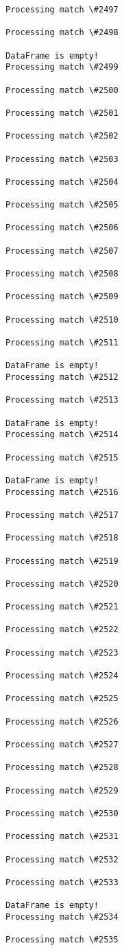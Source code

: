 \documentclass[11pt]{article}
\begin{document}
\begin{Verbatim}[commandchars=\\\{\}]
Processing match \#2497

Processing match \#2498

DataFrame is empty!
Processing match \#2499

Processing match \#2500

Processing match \#2501

Processing match \#2502

Processing match \#2503

Processing match \#2504

Processing match \#2505

Processing match \#2506

Processing match \#2507

Processing match \#2508

Processing match \#2509

Processing match \#2510

Processing match \#2511

DataFrame is empty!
Processing match \#2512

Processing match \#2513

DataFrame is empty!
Processing match \#2514

Processing match \#2515

DataFrame is empty!
Processing match \#2516

Processing match \#2517

Processing match \#2518

Processing match \#2519

Processing match \#2520

Processing match \#2521

Processing match \#2522

Processing match \#2523

Processing match \#2524

Processing match \#2525

Processing match \#2526

Processing match \#2527

Processing match \#2528

Processing match \#2529

Processing match \#2530

Processing match \#2531

Processing match \#2532

Processing match \#2533

DataFrame is empty!
Processing match \#2534

Processing match \#2535


\end{Verbatim}
\end{document}
